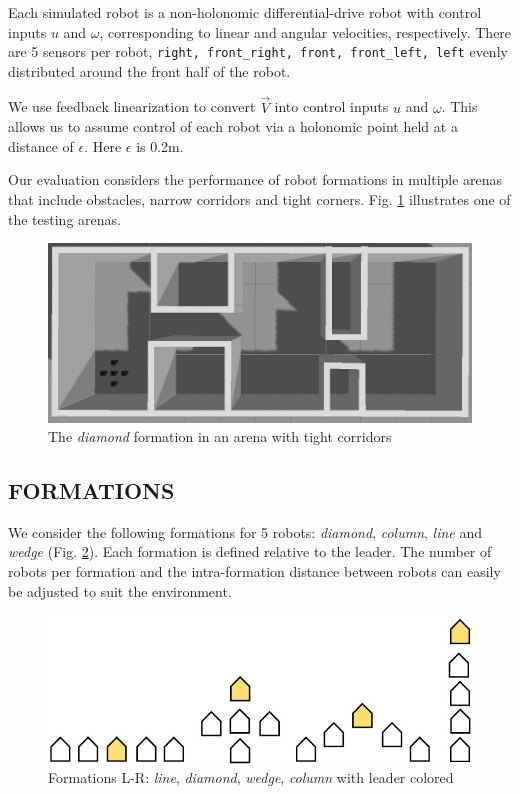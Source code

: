 \documentclass[letterpaper, 10 pt, conference]{ieeeconf}  %
\begin{document}
Each simulated robot is a non-holonomic differential-drive robot with control inputs $u$ and $\omega$, corresponding to linear and angular velocities, respectively. There are 5 sensors per robot, \texttt{right, front\_right, front, front\_left, left} evenly distributed around the front half of the robot.

We use feedback linearization to convert $\vec{V}$ into control inputs $u$ and $\omega$. This allows us to assume control of each robot via a holonomic point held at a distance of $\epsilon$. Here $\epsilon$ is 0.2m.

Our evaluation considers the performance of robot formations in multiple arenas that include obstacles, narrow corridors and tight corners. Fig. \ref{corridorworld} illustrates one of the testing arenas.

\begin{figure}[thpb]
\centering
\includegraphics[width=\linewidth]{images/corridorworld.png}
\caption{The \textit{diamond} formation in an arena with tight corridors}
\label{corridorworld}
\end{figure}

\subsection{FORMATIONS}

We consider the following formations for 5 robots: \textit{diamond}, \textit{column}, \textit{line} and \textit{wedge} (Fig. \ref{formation_shapes}). Each formation is defined relative to the leader. The number of robots per formation and the intra-formation distance between robots can easily be adjusted to suit the environment.

\begin{figure}[thpb]
\centering
\includegraphics[width=0.7\linewidth]{images/formation_shapes.jpg}
\caption{Formations L-R: \textit{line}, \textit{diamond}, \textit{wedge}, \textit{column} with leader colored}
\label{formation_shapes}
\end{figure}
\end{document}

